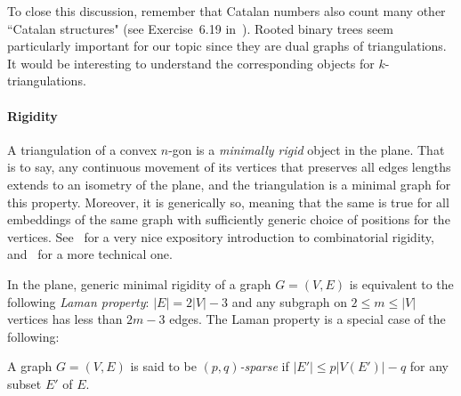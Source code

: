 \documentclass[12pt]{amsart}
\begin{document}


\medskip

To close this discussion, remember that Catalan numbers also count many other ``Catalan structures" (see Exercise~6.19 in~\cite{s-ec2-99}). Rooted binary trees seem particularly important for our topic since they are dual graphs of triangulations.
It would be interesting to understand the corresponding objects for $k$-triangulations.

\bigskip

\paragraph{{\sc Rigidity}}

A triangulation of a convex $n$-gon is a \emph {minimally rigid} object in the plane. That is to say, any continuous movement of its vertices that preserves all edges lengths extends to an isometry of the plane, and the triangulation is a minimal graph for this property. Moreover, it is generically so, meaning that the same is true for all embeddings of the same graph with sufficiently generic choice of positions for the vertices.
See~\cite{g-cf-01} for a very nice expository introduction to combinatorial rigidity, and~\cite{gss-cr-93} for a more technical one.

In the plane, generic minimal rigidity of a graph $G=(V,E)$ is equivalent to the following \emph{Laman property}: $|E|=2|V|-3$ and any subgraph on $2\le m\le |V|$ vertices has less than $2m-3$ edges. The Laman property is a special case of the following:

\begin{definition}
A graph $G=(V,E)$ is said to be \emph{$(p,q)$-sparse} if $|E'|\le p|V(E')|-q$ for any subset $E'$ of $E$. 
\end{definition}
\end{document}
